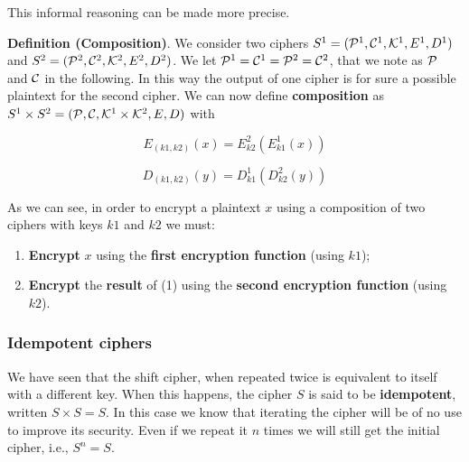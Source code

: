 This informal reasoning can be made more precise.

\textbf{Definition (Composition)}. We consider two ciphers $S^1=({\cal P}^1,{\cal C}^1,{\cal K}^1,E^1,D^1)$ and $S^2=({\cal P}^2,{\cal C}^2,{\cal K}^2,E^2,D^2)$. We let ${\cal P}^1={\cal C}^1={\cal P}^2={\cal C}^2$, that we note as ${\cal P}$ and ${\cal C}$ in the following. In this way the output of one cipher is for sure a possible plaintext for the second cipher. We can now define \textbf{composition} as $S^1 \times S^2 = ({\cal P},{\cal C},{\cal K}^1\times{\cal K}^2,E,D)$ with

$$
E_{(k1,k2)}(x) = E^2_{k2}(E^1_{k1}(x))
$$

$$
D_{(k1,k2)}(y) = D^1_{k1}(D^2_{k2}(y))
$$

As we can see, in order to encrypt a plaintext $x$ using a composition of two ciphers with keys $k1$ and $k2$ we must:

\begin{enumerate}
    \item \textbf{Encrypt} $x$ using the \textbf{first encryption function} (using $k1$);
    \item \textbf{Encrypt} the \textbf{result} of (1) using the \textbf{second encryption function} (using $k2$).
\end{enumerate}


\subsubsection{Idempotent ciphers}
We have seen that the shift cipher, when repeated twice is equivalent to itself with a different key. When this happens, the cipher $S$ is said to be \textbf{idempotent}, written $S \times S = S$. In this case we know that iterating the cipher will be of no use to improve its security. Even if we repeat it $n$ times we will still get the initial cipher, i.e., $S^n = S$.

